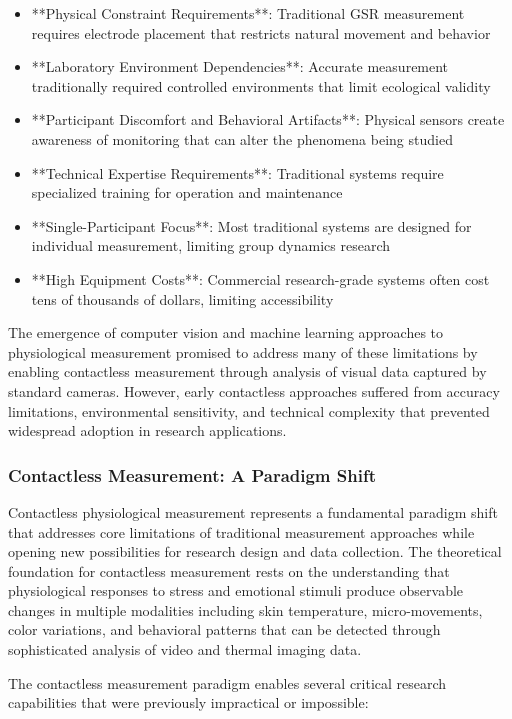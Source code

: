 \documentclass[11pt,a4paper]{report}
\begin{document}
\begin{itemize}
\item **Physical Constraint Requirements**: Traditional GSR measurement requires electrode placement that restricts natural
  movement and behavior
\item **Laboratory Environment Dependencies**: Accurate measurement traditionally required controlled environments that
  limit ecological validity
\item **Participant Discomfort and Behavioral Artifacts**: Physical sensors create awareness of monitoring that can alter
  the phenomena being studied
\item **Technical Expertise Requirements**: Traditional systems require specialized training for operation and maintenance
\item **Single-Participant Focus**: Most traditional systems are designed for individual measurement, limiting group
  dynamics research
\item **High Equipment Costs**: Commercial research-grade systems often cost tens of thousands of dollars, limiting
  accessibility

\end{itemize}
The emergence of computer vision and machine learning approaches to physiological measurement promised to address many
of these limitations by enabling contactless measurement through analysis of visual data captured by standard cameras.
However, early contactless approaches suffered from accuracy limitations, environmental sensitivity, and technical
complexity that prevented widespread adoption in research applications.

\subsubsection{Contactless Measurement: A Paradigm Shift}

Contactless physiological measurement represents a fundamental paradigm shift that addresses core limitations of
traditional measurement approaches while opening new possibilities for research design and data collection. The
theoretical foundation for contactless measurement rests on the understanding that physiological responses to stress and
emotional stimuli produce observable changes in multiple modalities including skin temperature, micro-movements, color
variations, and behavioral patterns that can be detected through sophisticated analysis of video and thermal imaging
data.

The contactless measurement paradigm enables several critical research capabilities that were previously impractical or
impossible:
\end{document}
